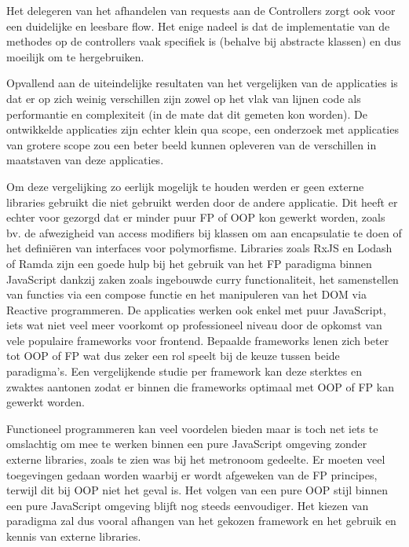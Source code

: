 Het delegeren van het afhandelen van requests aan de Controllers zorgt ook voor een duidelijke en leesbare flow. Het enige nadeel is dat de implementatie van de methodes op de controllers vaak specifiek is (behalve bij abstracte klassen) en dus moeilijk om te hergebruiken.

Opvallend aan de uiteindelijke resultaten van het vergelijken van de applicaties is dat er op zich weinig verschillen zijn zowel op het vlak van lijnen code als performantie en complexiteit (in de mate dat dit gemeten kon worden). De ontwikkelde applicaties zijn echter klein qua scope, een onderzoek met applicaties van grotere scope zou een beter beeld kunnen opleveren van de verschillen in maatstaven van deze applicaties.

Om deze vergelijking zo eerlijk mogelijk te houden werden er geen externe libraries gebruikt die niet gebruikt werden door de andere applicatie. Dit heeft er echter voor gezorgd dat er minder puur FP of OOP kon gewerkt worden, zoals bv. de afwezigheid van access modifiers bij klassen om aan encapsulatie te doen of het definiëren van interfaces voor polymorfisme. Libraries zoals RxJS en Lodash of Ramda zijn een goede hulp bij het gebruik van het FP paradigma binnen JavaScript dankzij zaken zoals ingebouwde curry functionaliteit, het samenstellen van functies via een compose functie en het manipuleren van het DOM via Reactive programmeren. De applicaties werken ook enkel met puur JavaScript, iets wat niet veel meer voorkomt op professioneel niveau door de opkomst van vele populaire frameworks voor frontend. Bepaalde frameworks lenen zich beter tot OOP of FP wat dus zeker een rol speelt bij de keuze tussen beide paradigma's. Een vergelijkende studie per framework kan deze sterktes en zwaktes aantonen zodat er binnen die frameworks optimaal met OOP of FP kan gewerkt worden.

Functioneel programmeren kan veel voordelen bieden maar is toch net iets te omslachtig om mee te werken binnen een pure JavaScript omgeving zonder externe libraries, zoals te zien was bij het metronoom gedeelte. Er moeten veel toegevingen gedaan worden waarbij er wordt afgeweken van de FP principes, terwijl dit bij OOP niet het geval is. Het volgen van een pure OOP stijl binnen een pure JavaScript omgeving blijft nog steeds eenvoudiger. Het kiezen van paradigma zal dus vooral afhangen van het gekozen framework en het gebruik en kennis van externe libraries.

